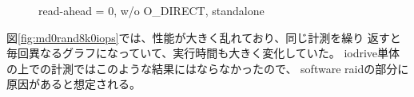 \documentclass[11pt,a4paper]{jsarticle}
\newlength{\subfigwidth}
\newlength{\subfigcolsep}
\begin{document}
\begin{figure}[thbp]
 \setlength{\subfigwidth}{.5\linewidth}
 \addtolength{\subfigwidth}{-.5\subfigcolsep}
 \begin{minipage}[b]{\subfigwidth}
 \end{minipage}
  \begin{minipage}[b]{\subfigwidth}
  \end{minipage}
  \caption{read-ahead = 0, w/o O\_DIRECT, standalone}
  \label{fig:fioarand8k0}
\end{figure}

図\ref{fig:md0rand8k0iops}では、性能が大きく乱れており、同じ計測を繰り
返すと毎回異なるグラフになっていて、実行時間も大きく変化していた。
iodrive単体の上での計測ではこのような結果にはならなかったので、
software raidの部分に原因があると想定される。
\end{document}
